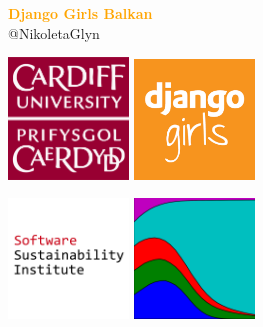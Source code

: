 \documentclass{beamer}
\begin{document}
\begin{frame}
    \begin{center}
        \LARGE{\textbf{\textcolor{orange}{Django Girls Balkan}}} \\

        \vspace{1cm}
        \normalsize{@NikoletaGlyn}

    \end{center}
\end{frame}

\begin{frame}
    \begin{center}
    \includegraphics[width=0.24\textwidth]{static/cardiff_uni_logo.png}\hspace{6pt}
    \includegraphics[width=0.24\textwidth, height=0.245\textwidth]{static/django_girls.png}\vspace{10pt}

    \includegraphics[width=0.24\textwidth]{static/ssi-logo.png} \hspace{6pt}
    \includegraphics[width=0.24\textwidth]{static/axelrod-logo.png}

    \end{center}
\end{frame}
\end{document}
